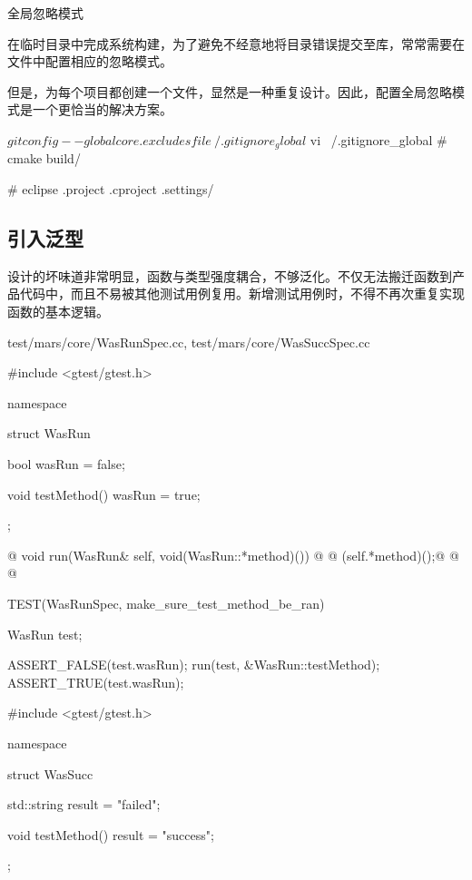\begin{content}
\begin{episode}{全局忽略模式}
\begin{content}

在临时目录中完成系统构建，为了避免不经意地将目录错误提交至库，常常需要在文件中配置相应的忽略模式。

但是，为每个项目都创建一个文件，显然是一种重复设计。因此，配置全局忽略模式是一个更恰当的解决方案。

 \begin{java}
$ git config --global core.excludesfile ~/.gitignore_global
$ vi ~/.gitignore_global
# cmake
build/

# eclipse
.project
.cproject
.settings/
 \end{java}

\end{content}
\end{episode}

\subsection{引入泛型}

设计的坏味道非常明显，函数与类型强度耦合，不够泛化。不仅无法搬迁函数到产品代码中，而且不易被其他测试用例复用。新增测试用例时，不得不再次重复实现函数的基本逻辑。

\begin{diff}{test/mars/core/WasRunSpec.cc, test/mars/core/WasSuccSpec.cc}
\begin{minicpp}
#include <gtest/gtest.h>

namespace {
  struct WasRun {
    bool wasRun = false;

    void testMethod() {
      wasRun = true;
    }
  };
  
@  void run(WasRun& self, void(WasRun::*method)()) {@
@    (self.*method)();@
@  }@
}

TEST(WasRunSpec, make_sure_test_method_be_ran) {
  WasRun test;

  ASSERT_FALSE(test.wasRun);
  run(test, &WasRun::testMethod);
  ASSERT_TRUE(test.wasRun);
}
\end{minicpp}
\tcblower
\begin{minicpp}
#include <gtest/gtest.h>

namespace {
  struct WasSucc {
    std::string result = "failed";

    void testMethod() {
      result = "success";
    }
  };

}
\end{minicpp}
\end{diff}
\end{content}
